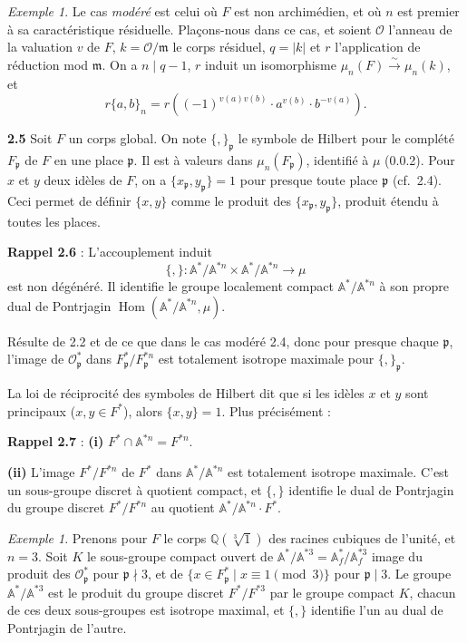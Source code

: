 \documentclass[12pt,a4paper]{article}
\theoremstyle{plain}
\theoremstyle{definition}
\theoremstyle{remark}
\newtheorem{example}[theorem]{Exemple}
\DeclareMathOperator{\Hom}{Hom}
\newcommand{\QQ}{\mathbb{Q}}
\newcommand{\Af}{\mathbb{A}}
\newcommand{\cO}{\mathcal{O}}
\newcommand{\frakp}{\mathfrak{p}}
\newcommand{\frakm}{\mathfrak{m}}
\providecommand{\QQ}{\mathbb{Q}}
\providecommand{\cO}{\mathcal{O}}
\providecommand{\frakm}{\mathfrak{m}}
\providecommand{\frakp}{\mathfrak{p}}
\providecommand{\Hom}{\operatorname{Hom}}
\begin{document}
\begin{example}
Le cas \emph{modéré} est celui où $F$ est non archimédien, et où $n$ est premier à sa caractéristique résiduelle. Plaçons-nous dans ce cas, et soient $\cO$ l'anneau de la valuation $v$ de $F$, $k = \cO/\frakm$ le corps résiduel, $q = |k|$ et $r$ l'application de réduction mod $\frakm$. On a $n \mid q - 1$, $r$ induit un isomorphisme $\mu_n(F) \xrightarrow{\sim} \mu_n(k)$, et
\begin{equation}\label{eq:2.4.1}
r\{a, b\}_n = r\left((-1)^{v(a)v(b)} \cdot a^{v(b)} \cdot b^{-v(a)}\right).
\tag{2.4.1}
\end{equation}
\end{example}

\textbf{2.5} Soit $F$ un corps global. On note $\{,\}_\frakp$ le symbole de Hilbert pour le complété $F_\frakp$ de $F$ en une place $\frakp$. Il est à valeurs dans $\mu_n(F_\frakp)$, identifié à $\mu$ (0.0.2). Pour $x$ et $y$ deux idèles de $F$, on a $\{x_\frakp, y_\frakp\} = 1$ pour presque toute place $\frakp$ (cf.\ 2.4). Ceci permet de définir $\{x, y\}$ comme le produit des $\{x_\frakp, y_\frakp\}$, produit étendu à toutes les places.

\textbf{Rappel 2.6} : L'accouplement induit
\[
\{,\} : \Af^*/\Af^{*n} \times \Af^*/\Af^{*n} \longrightarrow \mu
\]
est non dégénéré. Il identifie le groupe localement compact $\Af^*/\Af^{*n}$ à son propre dual de Pontrjagin $\Hom(\Af^*/\Af^{*n}, \mu)$.

Résulte de 2.2 et de ce que dans le cas modéré 2.4, donc pour presque chaque $\frakp$, l'image de $\cO_\frakp^*$ dans $F_\frakp^*/F_\frakp^{*n}$ est totalement isotrope maximale pour $\{,\}_\frakp$.

La loi de réciprocité des symboles de Hilbert dit que si les idèles $x$ et $y$ sont principaux ($x, y \in F^*$), alors $\{x, y\} = 1$. Plus précisément :

\textbf{Rappel 2.7} : \textbf{(i)} $F^* \cap \Af^{*n} = F^{*n}$.

\textbf{(ii)} L'image $F^*/F^{*n}$ de $F^*$ dans $\Af^*/\Af^{*n}$ est totalement isotrope maximale. C'est un sous-groupe discret à quotient compact, et $\{,\}$ identifie le dual de Pontrjagin du groupe discret $F^*/F^{*n}$ au quotient $\Af^*/\Af^{*n} \cdot F^*$.

\begin{example}
Prenons pour $F$ le corps $\QQ(\sqrt[3]{1})$ des racines cubiques de l'unité, et $n = 3$. Soit $K$ le sous-groupe compact ouvert de $\Af^*/\Af^{*3} = \Af_f^*/\Af_f^{*3}$ image du produit des $\cO_\frakp^*$ pour $\frakp \nmid 3$, et de $\{x \in F_\frakp^* \mid x \equiv 1 \pmod 3\}$ pour $\frakp \mid 3$. Le groupe $\Af^*/\Af^{*3}$ est le produit du groupe discret $F^*/F^{*3}$ par le groupe compact $K$, chacun de ces deux sous-groupes est isotrope maximal, et $\{,\}$ identifie l'un au dual de Pontrjagin de l'autre.
\end{example}
\end{document}
